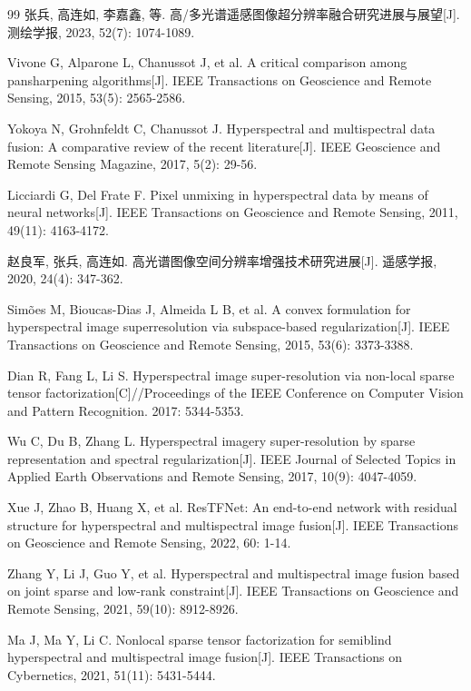 \documentclass[UTF8,a4paper,11pt]{ctexart}
\begin{document}
\small
\begin{thebibliography}{99}
 张兵, 高连如, 李嘉鑫, 等. 高/多光谱遥感图像超分辨率融合研究进展与展望[J]. 测绘学报, 2023, 52(7): 1074-1089.

 Vivone G, Alparone L, Chanussot J, et al. A critical comparison among pansharpening algorithms[J]. IEEE Transactions on Geoscience and Remote Sensing, 2015, 53(5): 2565-2586.

 Yokoya N, Grohnfeldt C, Chanussot J. Hyperspectral and multispectral data fusion: A comparative review of the recent literature[J]. IEEE Geoscience and Remote Sensing Magazine, 2017, 5(2): 29-56.

 Licciardi G, Del Frate F. Pixel unmixing in hyperspectral data by means of neural networks[J]. IEEE Transactions on Geoscience and Remote Sensing, 2011, 49(11): 4163-4172.

 赵良军, 张兵, 高连如. 高光谱图像空间分辨率增强技术研究进展[J]. 遥感学报, 2020, 24(4): 347-362.

 Sim\~oes M, Bioucas-Dias J, Almeida L B, et al. A convex formulation for hyperspectral image superresolution via subspace-based regularization[J]. IEEE Transactions on Geoscience and Remote Sensing, 2015, 53(6): 3373-3388.

 Dian R, Fang L, Li S. Hyperspectral image super-resolution via non-local sparse tensor factorization[C]//Proceedings of the IEEE Conference on Computer Vision and Pattern Recognition. 2017: 5344-5353.

 Wu C, Du B, Zhang L. Hyperspectral imagery super-resolution by sparse representation and spectral regularization[J]. IEEE Journal of Selected Topics in Applied Earth Observations and Remote Sensing, 2017, 10(9): 4047-4059.

 Xue J, Zhao B, Huang X, et al. ResTFNet: An end-to-end network with residual structure for hyperspectral and multispectral image fusion[J]. IEEE Transactions on Geoscience and Remote Sensing, 2022, 60: 1-14.

 Zhang Y, Li J, Guo Y, et al. Hyperspectral and multispectral image fusion based on joint sparse and low-rank constraint[J]. IEEE Transactions on Geoscience and Remote Sensing, 2021, 59(10): 8912-8926.

 Ma J, Ma Y, Li C. Nonlocal sparse tensor factorization for semiblind hyperspectral and multispectral image fusion[J]. IEEE Transactions on Cybernetics, 2021, 51(11): 5431-5444.


\end{thebibliography}
\end{document}
